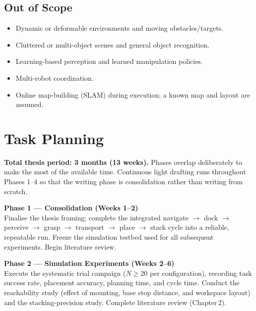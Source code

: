 \documentclass[11pt,a4paper]{article}
\begin{document}
\subsection{Out of Scope}
\begin{tcolorbox}[colback=boxbg, colframe=accent, arc=3pt, boxrule=1pt,
    left=1em, right=1em, top=0.5em, bottom=0.5em]
    \begin{itemize}[label=\textbullet, leftmargin=1em, topsep=0.2em, itemsep=0.2em]
        \item Dynamic or deformable environments and moving obstacles/targets.
        \item Cluttered or multi-object scenes and general object recognition.
        \item Learning-based perception and learned manipulation policies.
        \item Multi-robot coordination.
        \item Online map-building (SLAM) during execution; a known map and layout are
              assumed.
    \end{itemize}
\end{tcolorbox}

\newpage

\section{Task Planning}

\textbf{Total thesis period: 3 months (13 weeks).}
Phases overlap deliberately to make the most of the available time.
Continuous light drafting runs throughout Phases 1–4 so that the writing phase
is consolidation rather than writing from scratch.

\vspace{0.5em}

\noindent\textbf{Phase 1 — Consolidation (Weeks 1–2)}\\
Finalise the thesis framing; complete the integrated
navigate $\to$ dock $\to$ perceive $\to$ grasp $\to$ transport $\to$ place $\to$ stack
cycle into a reliable, repeatable run. Freeze the simulation testbed used for all
subsequent experiments. Begin literature review.

\vspace{0.5em}

\noindent\textbf{Phase 2 — Simulation Experiments (Weeks 2–6)}\\
Execute the systematic trial campaign ($N \geq 20$ per configuration), recording task
success rate, placement accuracy, planning time, and cycle time.
Conduct the reachability study (effect of mounting, base stop distance, and workspace
layout) and the stacking-precision study. Complete literature review (Chapter\,2).
\end{document}
